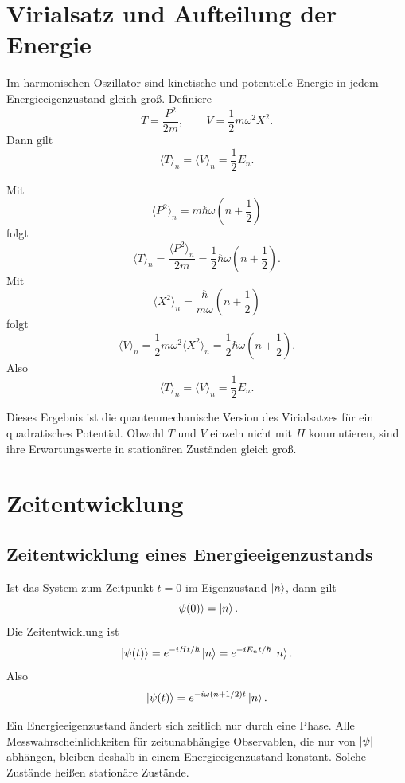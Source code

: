 \section{Virialsatz und Aufteilung der Energie}

Im harmonischen Oszillator sind kinetische und potentielle Energie in jedem Energieeigenzustand gleich groß. Definiere
\[
    T=\frac{P^2}{2m},
    \qquad
    V=\frac12m\omega^2X^2.
\]
Dann gilt
\[
    \langle T\rangle_n=\langle V\rangle_n=\frac12E_n.
\]

\begin{derivationbox}
Mit
\[
    \langle P^2\rangle_n=m\hbar\omega\left(n+\frac12\right)
\]
folgt
\[
    \langle T\rangle_n=\frac{\langle P^2\rangle_n}{2m}
    =\frac12\hbar\omega\left(n+\frac12\right).
\]
Mit
\[
    \langle X^2\rangle_n=\frac{\hbar}{m\omega}\left(n+\frac12\right)
\]
folgt
\[
    \langle V\rangle_n=\frac12m\omega^2\langle X^2\rangle_n
    =\frac12\hbar\omega\left(n+\frac12\right).
\]
Also
\[
    \langle T\rangle_n=\langle V\rangle_n=\frac12E_n.
\]
\end{derivationbox}

\begin{notebox}
Dieses Ergebnis ist die quantenmechanische Version des Virialsatzes für ein quadratisches Potential. Obwohl $T$ und $V$ einzeln nicht mit $H$ kommutieren, sind ihre Erwartungswerte in stationären Zuständen gleich groß.
\end{notebox}

\section{Zeitentwicklung}

\subsection{Zeitentwicklung eines Energieeigenzustands}

Ist das System zum Zeitpunkt $t=0$ im Eigenzustand $\left|n\right\rangle$, dann gilt
\[
    \left|\psi(0)\right\rangle=\left|n\right\rangle.
\]
Die Zeitentwicklung ist
\[
    \left|\psi(t)\right\rangle=e^{-iHt/\hbar}\left|n\right\rangle
    =e^{-iE_nt/\hbar}\left|n\right\rangle.
\]
Also
\[
    \left|\psi(t)\right\rangle=e^{-i\omega(n+1/2)t}\left|n\right\rangle.
\]

\begin{conceptbox}
Ein Energieeigenzustand ändert sich zeitlich nur durch eine Phase. Alle Messwahrscheinlichkeiten für zeitunabhängige Observablen, die nur von $\left| \psi \right|$ abhängen, bleiben deshalb in einem Energieeigenzustand konstant. Solche Zustände heißen stationäre Zustände.
\end{conceptbox}

